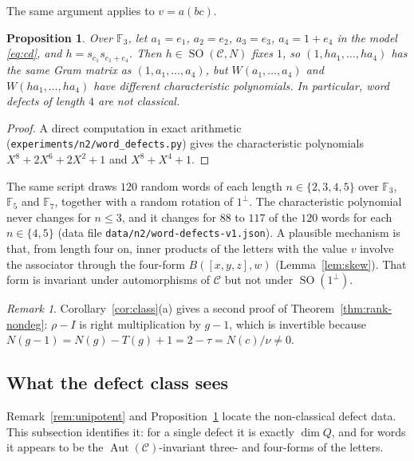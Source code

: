 \documentclass[11pt]{amsart}
\newtheorem{proposition}[theorem]{Proposition}
\theoremstyle{definition}
\theoremstyle{remark}
\newtheorem{remark}[theorem]{Remark}
\newcommand{\F}{\mathbb{F}}
\newcommand{\C}{\mathcal{C}}
\newcommand{\assoc}[3]{[#1,#2,#3]}
\DeclareMathOperator{\SO}{SO}
\begin{document}
The same argument applies to $v=a(bc)$.

\begin{proposition}\label{prop:word-four}
Over $\F_3$, let $a_1=e_1$, $a_2=e_2$, $a_3=e_3$, $a_4=1+e_4$ in the model
\eqref{eq:cd}, and $h=s_{e_1}s_{e_1+e_4}$. Then $h\in\SO(\C,N)$ fixes $1$, so
$(1,ha_1,\dots,ha_4)$ has the same Gram matrix as $(1,a_1,\dots,a_4)$, but
$W(a_1,\dots,a_4)$ and $W(ha_1,\dots,ha_4)$ have different characteristic
polynomials. In particular, word defects of length $4$ are not classical.
\end{proposition}

\begin{proof}
A direct computation in exact arithmetic
(\texttt{experiments/n2/word\_defects.py}) gives the characteristic
polynomials $X^8+2X^6+2X^2+1$ and $X^8+X^4+1$.
\end{proof}

The same script draws $120$ random words of each length $n\in\{2,3,4,5\}$ over
$\F_3$, $\F_5$ and $\F_7$, together with a random rotation of $1^\perp$. The
characteristic polynomial never changes for $n\le3$, and it changes for
$88$ to $117$ of the $120$ words for each $n\in\{4,5\}$ (data file
\texttt{data/n2/}\allowbreak\texttt{word-defects-v1.json}). A plausible mechanism is that, from
length four on, inner products of the letters with the value $v$ involve the
associator through the four-form $B(\assoc xyz,w)$
(Lemma~\ref{lem:skew}). That form is invariant under automorphisms of $\C$ but
not under $\SO(1^\perp)$.

\begin{remark}
Corollary~\ref{cor:class}(a) gives a second proof of
Theorem~\ref{thm:rank-nondeg}: $\rho-I$ is right multiplication by $g-1$,
which is invertible because $N(g-1)=N(g)-T(g)+1=2-\tau=N(c)/\nu\neq0$.
\end{remark}

\subsection*{What the defect class sees}
Remark~\ref{rem:unipotent} and Proposition~\ref{prop:word-four} locate the
non-classical defect data. This subsection identifies it: for a single defect
it is exactly $\dim Q$, and for words it appears to be the
$\operatorname{Aut}(\C)$-invariant three- and four-forms of the letters.
\end{document}
